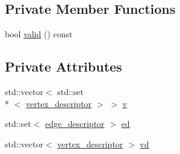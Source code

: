 \subsection*{Private Member Functions}
\begin{DoxyCompactItemize}
\item 
bool \hyperlink{classGraph_ab73ffdaeaaa43310e80b87f0c44c29e4}{valid} () const 
\end{DoxyCompactItemize}
\subsection*{Private Attributes}
\begin{DoxyCompactItemize}
\item 
std\-::vector$<$ std\-::set\\*
$<$ \hyperlink{classGraph_a9b97d75f995b7c1cb0b5760690bef3ba}{vertex\-\_\-descriptor} $>$ $>$ \hyperlink{classGraph_aa9654a924fa25bf3ee9e05b088c294ec}{v}
\item 
std\-::set$<$ \hyperlink{classGraph_ab641b227e6d3e56c3340cda156fc2bad}{edge\-\_\-descriptor} $>$ \hyperlink{classGraph_abb33247bf7089b7364b2d81b7f79f5a3}{ed}
\item 
std\-::vector$<$ \hyperlink{classGraph_a9b97d75f995b7c1cb0b5760690bef3ba}{vertex\-\_\-descriptor} $>$ \hyperlink{classGraph_ac93b6330606049e360a8344c30d7045a}{vd}
\end{DoxyCompactItemize}
